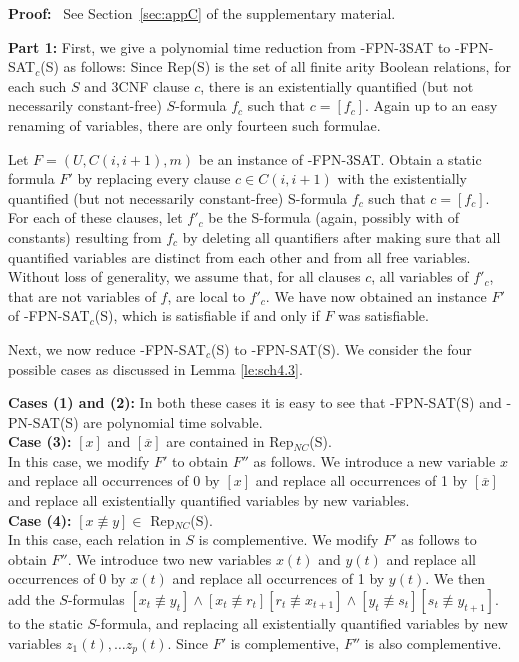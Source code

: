 \noindent
{\bf Proof:}~ See Section~\ref{sec:appC} of the supplementary material.

\iffalse
{\bf  Part 1:}
First, we give a polynomial time reduction 
from {-FPN-3SAT} to {-FPN-SAT$_c$(S)} as follows:
Since {\sf Rep(S)} is the set of all finite arity Boolean relations,
for each such $S$ and 3CNF clause $c$,
there is an existentially quantified (but not necessarily constant-free)
$S$-formula $f_c$ such that $c=[f_c]$.
Again up to an easy renaming of variables, there are only fourteen such
formulae.

Let $F = (U, C(i, i+1), m)$ be an instance of {-FPN-3SAT}. 
Obtain a static  formula $F'$
by replacing every clause $c \in C(i, i+1)$ with the 
existentially quantified (but not necessarily constant-free)
{\sf S}-formula $f_c$ such that $c=[f_c]$. For each of these clauses,
let $f'_c$ be the {\sf S}-formula (again, possibly with
of constants) resulting from $f_{c}$ by deleting
all quantifiers after making sure that all quantified variables are
distinct from each other and from all free variables.  Without loss of
generality, we assume that, for all clauses $c$,
all variables of $f'_c$, that are not variables
of $f$, are local to $f'_c$.
We have now obtained an instance $F'$ of {-FPN-SAT$_c$(S)}, 
which is satisfiable if and only if $F$ was satisfiable.

\noindent
Next, we now reduce {-FPN-SAT$_c$(S)} to {-FPN-SAT(S)}. 
We consider the four possible cases as discussed in Lemma \ref{le:sch4.3}.


\noindent
{\bf Cases (1) and (2):} 
In both these cases it is easy to see that {-FPN-SAT(S)}  and
{-PN-SAT(S)} are  polynomial time solvable.\\

\noindent
{\bf Case (3):} $[x]$ and $[\overline{x}]$ are contained in 
{\sf Rep$_{NC}$(S)}.\\
In this case, we modify $F'$ to obtain $F''$ as follows.
We introduce a new variable $x$ and replace all occurrences of
0 by $[x]$ and replace all occurrences of 1 by $[\overline{x}]$ and 
replace all existentially quantified variables by new variables. \\

\noindent
{\bf Case (4):} $[x \not\equiv y] \in$  {\sf Rep$_{NC}$(S)}.\\
In this case, each relation in $S$ is complementive.
We modify $F'$ as follows to obtain $F''$.
We introduce two new variables $x(t)$ and $y(t)$ and replace all occurrences of
0   by $x(t)$ and 
replace all occurrences of 1  by $y(t)$. We then add 
the $S$-formulas $[x_t \not\equiv y_t] \wedge [x_t \not \equiv r_{t}]
[r_t \not \equiv x_{t+1}] \wedge [y_t \not\equiv s_{t}]
[s_t \not\equiv y_{t+1}]$.  
to the static $S$-formula, and 
replacing all existentially quantified variables by new variables
$z_1(t), \ldots z_p(t)$.
Since $F'$ is complementive, $F''$ is also complementive.



